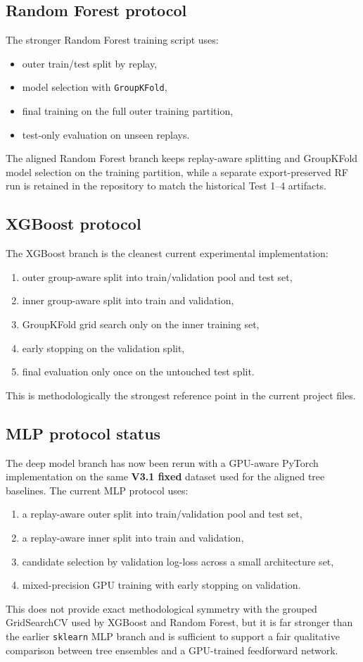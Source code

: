 \documentclass[11pt,a4paper]{article}
\begin{document}
\subsection{Random Forest protocol}
The stronger Random Forest training script uses:
\begin{itemize}
    \item outer train/test split by replay,
    \item model selection with \texttt{GroupKFold},
    \item final training on the full outer training partition,
    \item test-only evaluation on unseen replays.
\end{itemize}
The aligned Random Forest branch keeps replay-aware splitting and GroupKFold model selection on the training partition, while a separate export-preserved RF run is retained in the repository to match the historical Test 1--4 artifacts.

\subsection{XGBoost protocol}
The XGBoost branch is the cleanest current experimental implementation:
\begin{enumerate}
    \item outer group-aware split into train/validation pool and test set,
    \item inner group-aware split into train and validation,
    \item GroupKFold grid search only on the inner training set,
    \item early stopping on the validation split,
    \item final evaluation only once on the untouched test split.
\end{enumerate}
This is methodologically the strongest reference point in the current project files.

\subsection{MLP protocol status}
The deep model branch has now been rerun with a GPU-aware PyTorch implementation on the same \textbf{V3.1 fixed} dataset used for the aligned tree baselines. The current MLP protocol uses:
\begin{enumerate}
    \item a replay-aware outer split into train/validation pool and test set,
    \item a replay-aware inner split into train and validation,
    \item candidate selection by validation log-loss across a small architecture set,
    \item mixed-precision GPU training with early stopping on validation.
\end{enumerate}
This does not provide exact methodological symmetry with the grouped GridSearchCV used by XGBoost and Random Forest, but it is far stronger than the earlier \texttt{sklearn} MLP branch and is sufficient to support a fair qualitative comparison between tree ensembles and a GPU-trained feedforward network.
\end{document}
